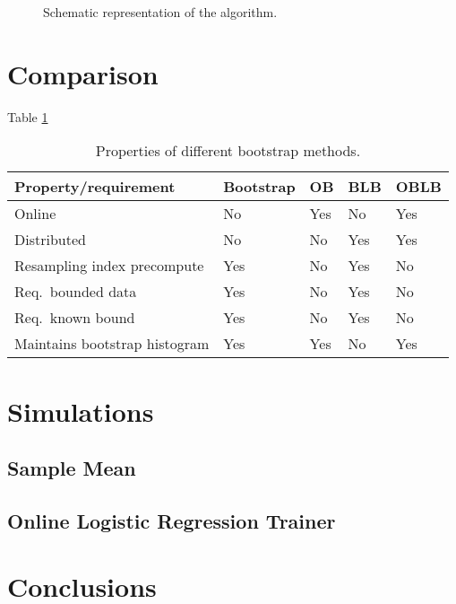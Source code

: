 \documentclass{article}
\begin{document}
\begin{sidewaysfigure}[tbp]
\caption{Schematic representation of the algorithm.}
\end{sidewaysfigure}


\section{Comparison}

Table \ref{bootcomp}

\begin{table}[h]
\caption{Properties of different bootstrap methods.}
\label{bootcomp}
\begin{tabular}{lllll}
\hline
\hline
Property/requirement & Bootstrap & OB & BLB & OBLB \\
\hline
Online & No & Yes & No & Yes \\ 
Distributed & No & No & Yes &  Yes \\ 
Resampling index precompute & Yes & No & Yes & No \\ 
Req.\ bounded data & Yes & No & Yes & No \\ 
Req.\ known bound & Yes & No & Yes & No \\ 
Maintains bootstrap histogram & Yes & Yes & No & Yes \\
\hline
\hline
\end{tabular}
\end{table}


\section{Simulations}

\subsection{Sample Mean}

\subsection{Online Logistic Regression Trainer}


\section{Conclusions}





{}

\end{document}
